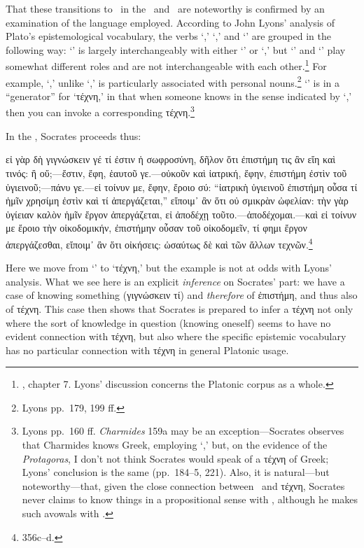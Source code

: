 \documentclass[11pt,letterpaper,oneside]{amsart} %
\begin{document}
 
That these transitions to \techne\ in the \prot\ and \charm\ are noteworthy is confirmed by an examination of the language employed. According to John Lyons' analysis of Plato's epistemological vocabulary, the verbs `\eidenai,' `\epistasthai,' and `\gignoskein' are grouped in the following way: `\eidenai' is largely interchangeably with either `\epistasthai' or `\gignoskein,' but `\epistasthai' and `\gignoskein' play somewhat different roles and are not interchangeable with each other.\footnote{\citet{lyons1972ssa}, chapter 7. Lyons' discussion concerns the Platonic corpus as a whole.} For example, `\gignoskein,' unlike `\epistasthai,' is particularly associated with personal nouns.\footnote{Lyons pp.\ 179, 199 ff.} `\epistasthai' is in a ``generator'' for `τέχνη,' in that when someone knows in the sense indicated by `\epistasthai,' then you can invoke a corresponding τέχνη.\footnote{Lyons pp.\ 160 ff. \emph{Charmides} 159a may be an exception---Socrates observes that Charmides knows Greek, employing `\epistasthai,' but, on the evidence of the \emph{Protagoras}, I don't not think Socrates would speak of a τέχνη of Greek; Lyons' conclusion is the same (pp.\ 184--5, 221). Also, it is natural---but noteworthy---that, given the close connection between \epistasthai\ and τέχνη, Socrates never claims to know things in a propositional sense with \epistasthai, although he makes such avowals with \eidenai.}

In the \charm, Socrates proceeds thus:\begin{squote} εἰ γὰρ δὴ γιγνώσκειν γέ τί ἐστιν ἡ σωφροσύνη, δῆλον ὅτι ἐπιστήμη τις ἂν εἴη καὶ τινός: ἢ οὔ;---ἔστιν, ἔφη, ἑαυτοῦ γε.---οὐκοῦν καὶ ἰατρική, ἔφην, ἐπιστήμη ἐστὶν τοῦ ὑγιεινοῦ;---πάνυ γε.---εἰ τοίνυν με, ἔφην, ἔροιο σύ: ``ἰατρικὴ ὑγιεινοῦ ἐπιστήμη οὖσα τί ἡμῖν χρησίμη ἐστὶν καὶ τί ἀπεργάζεται,'' εἴποιμ᾽ ἂν ὅτι οὐ σμικρὰν ὠφελίαν: τὴν γὰρ ὑγίειαν καλὸν ἡμῖν ἔργον ἀπεργάζεται, εἰ ἀποδέχῃ τοῦτο.---ἀποδέχομαι.---καὶ εἰ τοίνυν με ἔροιο τὴν οἰκοδομικήν, ἐπιστήμην οὖσαν τοῦ οἰκοδομεῖν, τί φημι ἔργον ἀπεργάζεσθαι, εἴποιμ᾽ ἂν ὅτι οἰκήσεις: ὡσαύτως δὲ καὶ τῶν ἄλλων τεχνῶν.\footnote{356c--d.}\end{squote} Here  we move from `\gignoskein' to `τέχνη,' but the example is not at odds with Lyons' analysis. What we see here is an explicit \emph{inference} on Socrates' part: we have a case of knowing something (γιγνώσκειν τί) and \emph{therefore} of ἐπιστήμη, and thus also of τέχνη. This case then shows that Socrates is prepared to infer a τέχνη not only where the sort of knowledge in question (knowing oneself) seems to have no evident connection with τέχνη, but also where the specific epistemic vocabulary has no particular connection with τέχνη in general Platonic usage.
\end{document}
